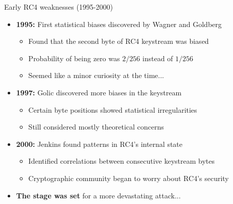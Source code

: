 \documentclass[aspectratio=169, lualatex, handout]{beamer}
\begin{document}
\begin{frame}{Early RC4 weaknesses (1995-2000)}
	\begin{itemize}[<+->]
		\item \textbf{1995:} First statistical biases discovered by Wagner and Goldberg
		      \begin{itemize}[<+->]
			      \item Found that the second byte of RC4 keystream was biased
			      \item Probability of being zero was $2/256$ instead of $1/256$
			      \item Seemed like a minor curiosity at the time...
		      \end{itemize}
		\item \textbf{1997:} Golic discovered more biases in the keystream
		      \begin{itemize}[<+->]
			      \item Certain byte positions showed statistical irregularities
			      \item Still considered mostly theoretical concerns
		      \end{itemize}
		\item \textbf{2000:} Jenkins found patterns in RC4's internal state
		      \begin{itemize}[<+->]
			      \item Identified correlations between consecutive keystream bytes
			      \item Cryptographic community began to worry about RC4's security
		      \end{itemize}
		\item \textbf{The stage was set} for a more devastating attack...
	\end{itemize}
\end{frame}
\end{document}
